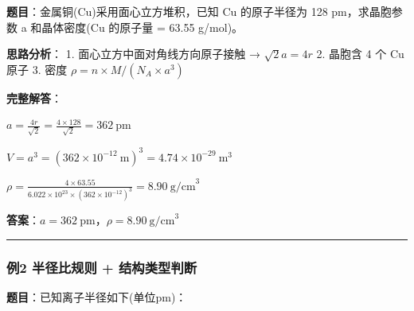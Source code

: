 \textbf{题目}：金属铜(Cu)采用面心立方堆积，已知 Cu 的原子半径为 128 pm，求晶胞参数 a 和晶体密度(Cu 的原子量 = 63.55 g/mol)。

\textbf{思路分析}：
1. 面心立方中面对角线方向原子接触 → \(\sqrt{2}a = 4r\)
2. 晶胞含 4 个 Cu 原子
3. 密度 \(\rho = n \times M / (N_A \times a^3)\)

\textbf{完整解答}：

\(a = \frac{4r}{\sqrt{2}} = \frac{4 \times 128}{\sqrt{2}} = 362\ \mathrm{pm}\)

\(V = a^3 = (362 \times 10^{-12}\ \mathrm{m})^3 = 4.74 \times 10^{-29}\ \mathrm{m}^3\)

\(\rho = \frac{4 \times 63.55}{6.022 \times 10^{23} \times (362 \times 10^{-12})^3} = 8.90\ \mathrm{g/cm}^3\)

\textbf{答案}：\(a = 362\ \mathrm{pm}\)，\(\rho = 8.90\ \mathrm{g/cm}^3\)

\begin{center}\rule{0.5\linewidth}{0.5pt}\end{center}

\subsubsection{例2 半径比规则 + 结构类型判断}\label{ux4f8b2-ux534aux5f84ux6bd4ux89c4ux5219-ux7ed3ux6784ux7c7bux578bux5224ux65ad}

\textbf{题目}：已知离子半径如下(单位pm)：

